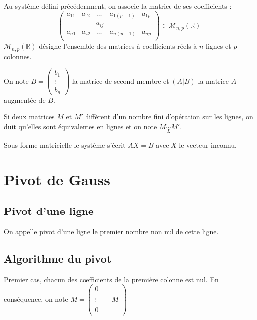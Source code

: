 \documentclass[10pt]{article}
\begin{document}
\begin{defi}
Au système défini précédemment, on associe la matrice de ses coefficients :
$$
\begin{pmatrix}
a_{11} & a_{12} & \ldots & a_{1(p-1)} & a_{1p} \\
 & & a_{ij} & & \\
a_{n1} & a_{n2} & \ldots & a_{n(p-1)} & a_{np} \\
\end{pmatrix} \in \mathcal{M}_{n,p}(\mathbb{R})
$$
$\mathcal{M}_{n,p}(\mathbb{R})$ désigne l'ensemble des matrices à coefficients réels à $n$ lignes et $p$ colonnes. 
\end{defi}

\begin{defi}
On note $B=\begin{pmatrix} b_1 \\ \vdots \\ b_n \end{pmatrix}$ la matrice de second membre et $(A|B)$ la matrice $A$ augmentée de $B$. 
\end{defi}


\begin{defi}
Si deux matrices $M$ et $M'$ diffèrent d'un nombre fini d'opération sur les lignes, on duit qu'elles sont équivalentes en lignes et on note $M \underset{L}{\sim} M'$. 
\end{defi}

\begin{rem}
Sous forme matricielle le système s'écrit $AX=B$ avec $X$ le vecteur inconnu. 
\end{rem}


\section{Pivot de Gauss}
\subsection{Pivot d'une ligne}
\begin{defi}
On appelle pivot d'une ligne le premier nombre non nul de cette ligne. 
\end{defi}

\subsection{Algorithme du pivot}
Premier cas, chacun des coefficients de la première colonne est nul. En conséquence, on note 
$M = \begin{pmatrix} 0 & | &  \\ \vdots & | & M \\ 0 & | &  \end{pmatrix}$ 
\end{document}
